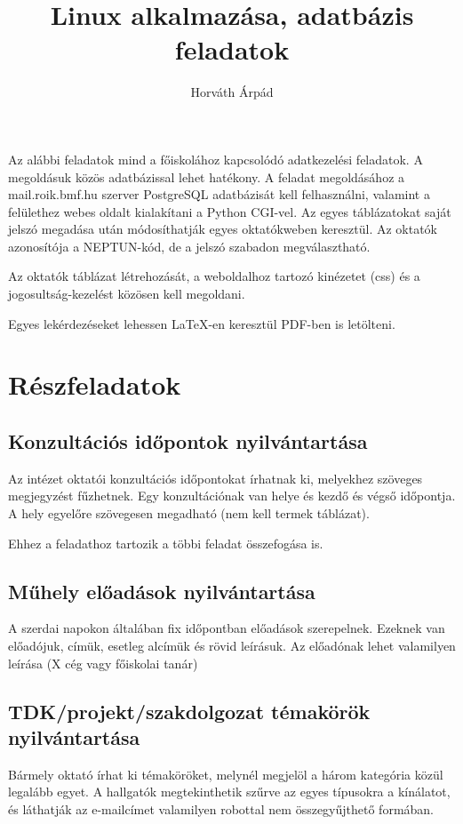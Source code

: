 \documentclass[a4paper]{article}
\begin{document}
\title{Linux alkalmazása, adatbázis feladatok}
\author{Horváth Árpád}
\maketitle

Az alábbi feladatok mind a főiskolához kapcsolódó adatkezelési
feladatok. A megoldásuk közös adatbázissal lehet hatékony. A feladat
megoldásához a mail.roik.bmf.hu szerver PostgreSQL adatbázisát kell
felhasználni, valamint a felülethez webes oldalt kialakítani a Python
CGI-vel.
Az egyes táblázatokat saját jelszó megadása után módosíthatják egyes
oktatókweben keresztül.
Az oktatók azonosítója a NEPTUN-kód, de a jelszó szabadon
megválasztható.

Az oktatók táblázat létrehozását, a weboldalhoz tartozó kinézetet (css)
és a jogosultság-kezelést közösen kell megoldani.

Egyes lekérdezéseket lehessen LaTeX-en keresztül PDF-ben is letölteni.

\section{Részfeladatok}

\subsection{Konzultációs időpontok nyilvántartása}
Az intézet oktatói konzultációs időpontokat írhatnak ki, melyekhez
szöveges megjegyzést fűzhetnek. Egy konzultációnak van helye és kezdő és
végső időpontja. A hely egyelőre szövegesen megadható (nem kell termek
táblázat).

Ehhez a feladathoz tartozik a többi feladat összefogása is.

\subsection{Műhely előadások nyilvántartása}
A szerdai napokon általában fix időpontban előadások szerepelnek.
Ezeknek van előadójuk, címük, esetleg alcímük és rövid leírásuk. Az
előadónak lehet valamilyen leírása (X cég vagy
főiskolai tanár)

\subsection{TDK/projekt/szakdolgozat témakörök nyilvántartása}
Bármely oktató írhat ki témaköröket, melynél megjelöl a három
kategória közül legalább egyet. A hallgatók megtekinthetik szűrve az
egyes típusokra a kínálatot, és láthatják az e-mailcímet valamilyen
robottal nem összegyűjthető formában.
\end{document}
